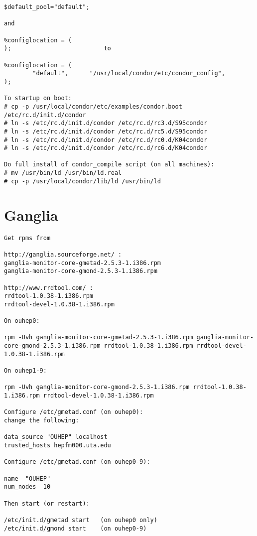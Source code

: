 \documentclass{revtex4}
\begin{document}
\begin{appendix}
\begin{verbatim}
$default_pool="default";

and 

%configlocation = (
);                          to

%configlocation = (
        "default",      "/usr/local/condor/etc/condor_config",
);

To startup on boot:
# cp -p /usr/local/condor/etc/examples/condor.boot /etc/rc.d/init.d/condor
# ln -s /etc/rc.d/init.d/condor /etc/rc.d/rc3.d/S95condor
# ln -s /etc/rc.d/init.d/condor /etc/rc.d/rc5.d/S95condor
# ln -s /etc/rc.d/init.d/condor /etc/rc.d/rc0.d/K04condor 
# ln -s /etc/rc.d/init.d/condor /etc/rc.d/rc6.d/K04condor

Do full install of condor_compile script (on all machines):
# mv /usr/bin/ld /usr/bin/ld.real
# cp -p /usr/local/condor/lib/ld /usr/bin/ld
\end{verbatim}

\newpage

\section{Ganglia \label{ganglia}}
\begin{verbatim}
Get rpms from 

http://ganglia.sourceforge.net/ :
ganglia-monitor-core-gmetad-2.5.3-1.i386.rpm 
ganglia-monitor-core-gmond-2.5.3-1.i386.rpm

http://www.rrdtool.com/ :
rrdtool-1.0.38-1.i386.rpm 
rrdtool-devel-1.0.38-1.i386.rpm

On ouhep0:

rpm -Uvh ganglia-monitor-core-gmetad-2.5.3-1.i386.rpm ganglia-monitor-core-gmond-2.5.3-1.i386.rpm rrdtool-1.0.38-1.i386.rpm rrdtool-devel-1.0.38-1.i386.rpm 

On ouhep1-9:

rpm -Uvh ganglia-monitor-core-gmond-2.5.3-1.i386.rpm rrdtool-1.0.38-1.i386.rpm rrdtool-devel-1.0.38-1.i386.rpm

Configure /etc/gmetad.conf (on ouhep0):
change the following:

data_source "OUHEP" localhost
trusted_hosts hepfm000.uta.edu

Configure /etc/gmetad.conf (on ouhep0-9):

name  "OUHEP"
num_nodes  10

Then start (or restart):

/etc/init.d/gmetad start   (on ouhep0 only)
/etc/init.d/gmond start    (on ouhep0-9)
\end{verbatim}


\end{appendix}
\end{document}
